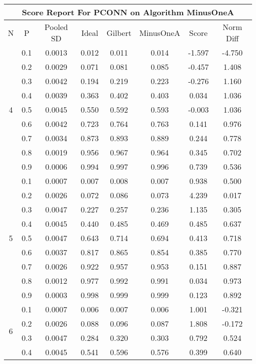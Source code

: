 \documentclass[11pt,a4paper]{report}
\begin{document}
\begin{longtable}{ | c | c || c | c | c | c | c | c | }
\hline
\multicolumn{8}{|c|}{ Score Report For PCONN on Algorithm MinusOneA} \\
\hline
N & P & Pooled SD &  Ideal &  Gilbert & MinusOneA  & Score & Norm Diff \\
 \hline
 \hline
 \endhead
\multirow{9}{*}{4} & 0.1 & 0.0013 & 0.012 & 0.011 & 0.014 & -1.597 & -4.750 \\
 & 0.2 & 0.0029 & 0.071 & 0.081 & 0.085 & -0.457 & 1.408 \\
 & 0.3 & 0.0042 & 0.194 & 0.219 & 0.223 & -0.276 & 1.160 \\
 & 0.4 & 0.0039 & 0.363 & 0.402 & 0.403 & 0.034 & 1.036 \\
 & 0.5 & 0.0045 & 0.550 & 0.592 & 0.593 & -0.003 & 1.036 \\
 & 0.6 & 0.0042 & 0.723 & 0.764 & 0.763 & 0.141 & 0.976 \\
 & 0.7 & 0.0034 & 0.873 & 0.893 & 0.889 & 0.244 & 0.778 \\
 & 0.8 & 0.0019 & 0.956 & 0.967 & 0.964 & 0.345 & 0.702 \\
 & 0.9 & 0.0006 & 0.994 & 0.997 & 0.996 & 0.739 & 0.536 \\
 \hline
\multirow{9}{*}{5} & 0.1 & 0.0007 & 0.007 & 0.008 & 0.007 & 0.938 & 0.500 \\
 & 0.2 & 0.0026 & 0.072 & 0.086 & 0.073 & 4.239 & 0.017 \\
 & 0.3 & 0.0047 & 0.227 & 0.257 & 0.236 & 1.135 & 0.305 \\
 & 0.4 & 0.0045 & 0.440 & 0.485 & 0.469 & 0.485 & 0.637 \\
 & 0.5 & 0.0047 & 0.643 & 0.714 & 0.694 & 0.413 & 0.718 \\
 & 0.6 & 0.0037 & 0.817 & 0.865 & 0.854 & 0.385 & 0.770 \\
 & 0.7 & 0.0026 & 0.922 & 0.957 & 0.953 & 0.151 & 0.887 \\
 & 0.8 & 0.0012 & 0.977 & 0.992 & 0.991 & 0.034 & 0.973 \\
 & 0.9 & 0.0003 & 0.998 & 0.999 & 0.999 & 0.123 & 0.892 \\
 \hline
\multirow{9}{*}{6} & 0.1 & 0.0007 & 0.006 & 0.007 & 0.006 & 1.001 & -0.321 \\
 & 0.2 & 0.0026 & 0.088 & 0.096 & 0.087 & 1.808 & -0.172 \\
 & 0.3 & 0.0047 & 0.284 & 0.320 & 0.303 & 0.792 & 0.524 \\
 & 0.4 & 0.0045 & 0.541 & 0.596 & 0.576 & 0.399 & 0.640 \\

\end{longtable}
\end{document}
